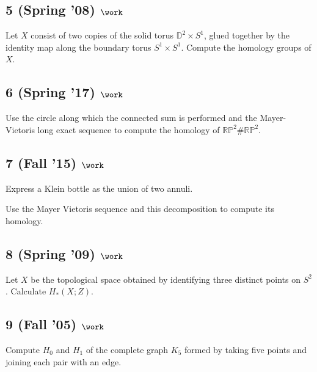 \hypertarget{spring-08-work-2}{%
\subsection{\texorpdfstring{5 (Spring '08)
\(\work\)}{5 (Spring '08) \textbackslash work}}\label{spring-08-work-2}}

Let \(X\) consist of two copies of the solid torus
\({\mathbb{D}}^2 \times S^1\), glued together by the identity map along
the boundary torus \(S^1 \times S^1\). Compute the homology groups of
\(X\).

\hypertarget{spring-17-work-1}{%
\subsection{\texorpdfstring{6 (Spring '17)
\(\work\)}{6 (Spring '17) \textbackslash work}}\label{spring-17-work-1}}

Use the circle along which the connected sum is performed and the
Mayer-Vietoris long exact sequence to compute the homology of
\({\mathbb{RP}}^2 \# {\mathbb{RP}}^2\).

\hypertarget{fall-15-work-1}{%
\subsection{\texorpdfstring{7 (Fall '15)
\(\work\)}{7 (Fall '15) \textbackslash work}}\label{fall-15-work-1}}

Express a Klein bottle as the union of two annuli.

Use the Mayer Vietoris sequence and this decomposition to compute its
homology.

\hypertarget{spring-09-work-4}{%
\subsection{\texorpdfstring{8 (Spring '09)
\(\work\)}{8 (Spring '09) \textbackslash work}}\label{spring-09-work-4}}

Let \(X\) be the topological space obtained by identifying three
distinct points on \(S^2\). Calculate \(H_* (X; Z)\).

\hypertarget{fall-05-work}{%
\subsection{\texorpdfstring{9 (Fall '05)
\(\work\)}{9 (Fall '05) \textbackslash work}}\label{fall-05-work}}

Compute \(H_0\) and \(H_1\) of the complete graph \(K_5\) formed by
taking five points and joining each pair with an edge.

